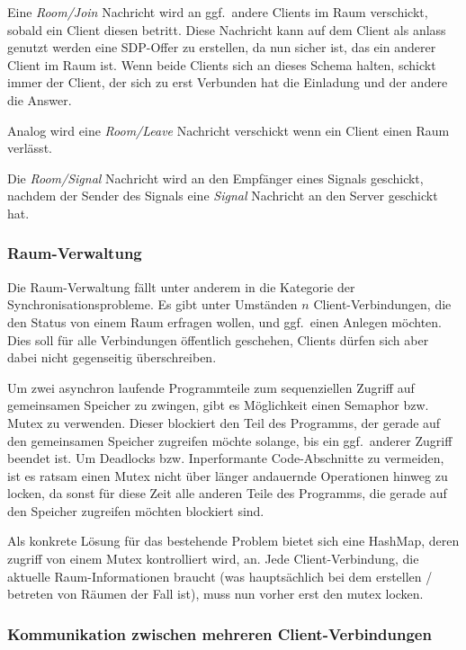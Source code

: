 \documentclass{article}
\begin{document}
\begin{onecolumn}
Eine \textit{Room/Join} Nachricht wird an ggf.\ andere Clients im Raum
verschickt, sobald ein Client diesen betritt. Diese Nachricht kann auf dem
Client als anlass genutzt werden eine SDP-Offer zu erstellen, da nun sicher
ist, das ein anderer Client im Raum ist. Wenn beide Clients sich an dieses
Schema halten, schickt immer der Client, der sich zu erst Verbunden hat die
Einladung und der andere die Answer.

Analog wird eine \textit{Room/Leave} Nachricht verschickt wenn ein Client einen
Raum verlässt.

Die \textit{Room/Signal} Nachricht wird an den Empfänger eines Signals
geschickt, nachdem der Sender des Signals eine \textit{Signal} Nachricht an den
Server geschickt hat.

\subsubsection{Raum-Verwaltung}

Die Raum-Verwaltung fällt unter anderem in die Kategorie der
Synchronisationsprobleme. Es gibt unter Umständen $n$ Client-Verbindungen, die
den Status von einem Raum erfragen wollen, und ggf.\ einen Anlegen möchten. Dies
soll für alle Verbindungen öffentlich geschehen, Clients dürfen sich aber dabei
nicht gegenseitig überschreiben.


Um zwei asynchron laufende Programmteile zum sequenziellen Zugriff auf
gemeinsamen Speicher zu zwingen, gibt es Möglichkeit einen Semaphor bzw. Mutex
zu verwenden. Dieser blockiert den Teil des Programms, der gerade auf den
gemeinsamen Speicher zugreifen möchte solange, bis ein ggf.\ anderer Zugriff
beendet ist. Um Deadlocks bzw. Inperformante Code-Abschnitte zu vermeiden, ist
es ratsam einen Mutex nicht über länger andauernde Operationen hinweg zu
locken, da sonst für diese Zeit alle anderen Teile des Programms, die gerade
auf den Speicher zugreifen möchten blockiert sind.

Als konkrete Lösung für das bestehende Problem bietet sich eine HashMap, deren
zugriff von einem Mutex kontrolliert wird, an. Jede Client-Verbindung, die
aktuelle Raum-Informationen braucht (was hauptsächlich bei dem erstellen /
betreten von Räumen der Fall ist), muss nun vorher erst den mutex locken. 

\subsubsection{Kommunikation zwischen mehreren Client-Verbindungen}


\end{onecolumn}
\end{document}
